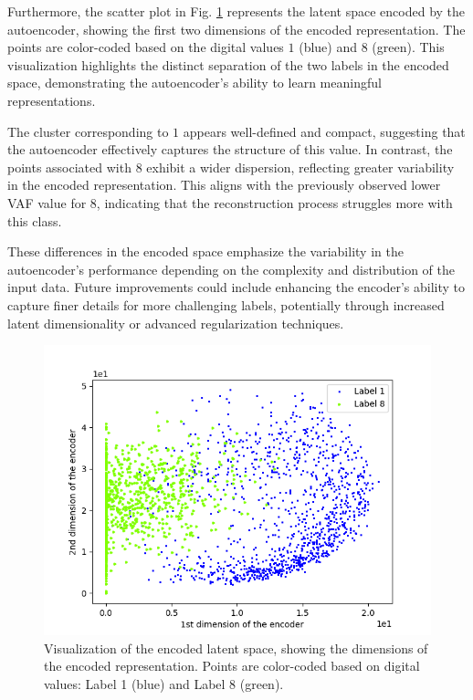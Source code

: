 \documentclass[9pt,technote]{IEEEtran}
\begin{document}
Furthermore, the scatter plot in Fig. \ref{fig:endodeddimentions} represents the latent space encoded by the autoencoder, showing the first two dimensions of the encoded representation. The points are color-coded based on the digital values $1$ (blue) and $8$ (green). This visualization highlights the distinct separation of the two labels in the encoded space, demonstrating the autoencoder's ability to learn meaningful representations.

The cluster corresponding to $1$ appears well-defined and compact, suggesting that the autoencoder effectively captures the structure of this value. In contrast, the points associated with $8$ exhibit a wider dispersion, reflecting greater variability in the encoded representation. This aligns with the previously observed lower VAF value for $8$, indicating that the reconstruction process struggles more with this class.

These differences in the encoded space emphasize the variability in the autoencoder's performance depending on the complexity and distribution of the input data. Future improvements could include enhancing the encoder's ability to capture finer details for more challenging labels, potentially through increased latent dimensionality or advanced regularization techniques.
\begin{figure}
	\centering
	\includegraphics[width=0.7\linewidth]{Resources/EndodedDImentions}
	\caption{Visualization of the encoded latent space, showing the dimensions of the encoded representation. Points are color-coded based on digital values: Label 1 (blue) and Label 8 (green).}
	\label{fig:endodeddimentions}
\end{figure}

\end{document}
